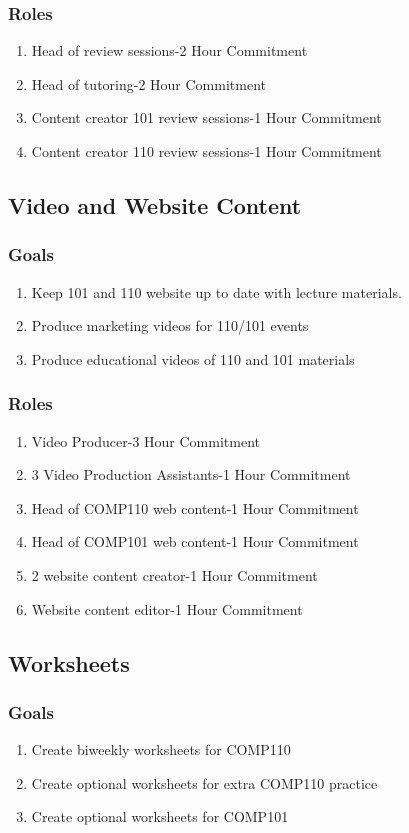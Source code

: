 \documentclass[a4paper]{article}
\begin{document}
\subsubsection{Roles}
\begin{enumerate}
\item Head of review sessions-2 Hour Commitment
\item Head of tutoring-2 Hour Commitment
\item Content creator 101 review sessions-1 Hour Commitment
\item Content creator 110 review sessions-1 Hour Commitment
\end{enumerate}
\subsection{Video and Website Content}
\subsubsection{Goals}
\begin{enumerate}
\item Keep 101 and 110 website up to date with lecture materials. 
\item Produce marketing videos for 110/101 events 
\item Produce educational videos of 110 and 101 materials
\end{enumerate}
\subsubsection{Roles}
\begin{enumerate}
\item Video Producer-3 Hour Commitment
\item 3 Video Production Assistants-1 Hour Commitment 
\item Head of COMP110 web content-1 Hour Commitment
\item Head of COMP101 web content-1 Hour Commitment
\item 2 website content creator-1 Hour Commitment
\item Website content editor-1 Hour Commitment
\end{enumerate}
\subsection{Worksheets}
\subsubsection{Goals}
\begin{enumerate}
\item Create biweekly worksheets for COMP110
\item Create optional worksheets for extra COMP110 practice
\item Create optional worksheets for COMP101
\end{enumerate}
\end{document}

